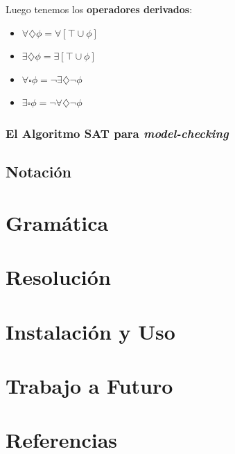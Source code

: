 \documentclass[11pt]{article}
\begin{document}
Luego tenemos los \textbf{operadores derivados}:

\begin{itemize}
  \item $\forall \diamondsuit \phi = \forall [\top \cup \phi]  $
  \item $\exists \diamondsuit \phi = \exists [\top \cup \phi] $
  \item $\forall \square \phi = \neg \exists \diamondsuit \neg \phi $
  \item $\exists \square \phi = \neg \forall \diamondsuit \neg \phi $
\end{itemize}

\subsubsection{El Algoritmo SAT para \emph{model-checking}}
\subsection{Notación}

\section{Gramática}

\section{Resolución}

\section{Instalación y Uso}

\section{Trabajo a Futuro}

\section{Referencias}
\end{document}
